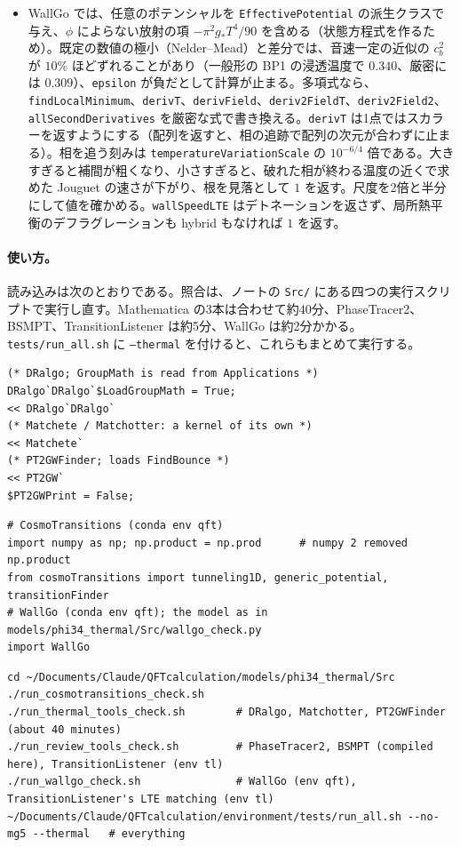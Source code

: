 \documentclass[a4paper,10pt]{ltjsarticle}
\begin{document}
\begin{itemize}
\item WallGo では、任意のポテンシャルを \texttt{EffectivePotential} の派生クラスで与え、$\phi$ によらない放射の項 $-\pi^2g_*T^4/90$ を含める（状態方程式を作るため）。既定の数値の極小（Nelder--Mead）と差分では、音速一定の近似の $c_b^2$ が $10\%$ ほどずれることがあり（一般形の BP1 の浸透温度で $0.340$、厳密には $0.309$）、\texttt{epsilon} が負だとして計算が止まる。多項式なら、\texttt{findLocalMinimum}、\texttt{derivT}、\texttt{derivField}、\texttt{deriv2FieldT}、\texttt{deriv2Field2}、\texttt{allSecondDerivatives} を厳密な式で書き換える。\texttt{derivT} は1点ではスカラーを返すようにする（配列を返すと、相の追跡で配列の次元が合わずに止まる）。相を追う刻みは \texttt{temperatureVariationScale} の $10^{-6/4}$ 倍である。大きすぎると補間が粗くなり、小さすぎると、破れた相が終わる温度の近くで求めた Jouguet の速さが下がり、根を見落として $1$ を返す。尺度を2倍と半分にして値を確かめる。\texttt{wallSpeedLTE} はデトネーションを返さず、局所熱平衡のデフラグレーションも hybrid もなければ $1$ を返す。
\end{itemize}

\paragraph{使い方。}読み込みは次のとおりである。照合は、ノートの \nolinkurl{Src/} にある四つの実行スクリプトで実行し直す。Mathematica の3本は合わせて約40分、PhaseTracer2、BSMPT、TransitionListener は約5分、WallGo は約2分かかる。\texttt{tests/run\_all.sh} に \texttt{--thermal} を付けると、これらもまとめて実行する。

\begin{Verbatim}
(* DRalgo; GroupMath is read from Applications *)
DRalgo`DRalgo`$LoadGroupMath = True;
<< DRalgo`DRalgo`
(* Matchete / Matchotter: a kernel of its own *)
<< Matchete`
(* PT2GWFinder; loads FindBounce *)
<< PT2GW`
$PT2GWPrint = False;
\end{Verbatim}
\begin{Verbatim}
# CosmoTransitions (conda env qft)
import numpy as np; np.product = np.prod      # numpy 2 removed np.product
from cosmoTransitions import tunneling1D, generic_potential, transitionFinder
# WallGo (conda env qft); the model as in models/phi34_thermal/Src/wallgo_check.py
import WallGo
\end{Verbatim}
\begin{Verbatim}
cd ~/Documents/Claude/QFTcalculation/models/phi34_thermal/Src
./run_cosmotransitions_check.sh
./run_thermal_tools_check.sh        # DRalgo, Matchotter, PT2GWFinder (about 40 minutes)
./run_review_tools_check.sh         # PhaseTracer2, BSMPT (compiled here), TransitionListener (env tl)
./run_wallgo_check.sh               # WallGo (env qft), TransitionListener's LTE matching (env tl)
~/Documents/Claude/QFTcalculation/environment/tests/run_all.sh --no-mg5 --thermal   # everything
\end{Verbatim}
\end{document}
